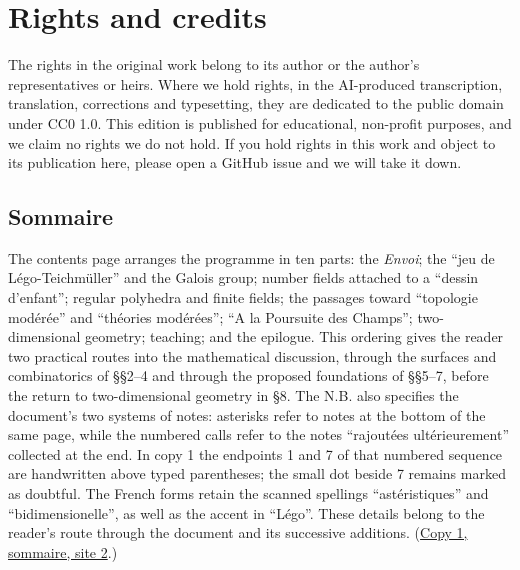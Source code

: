 \documentclass[11pt,a4paper]{article}
\begin{document}
\section*{Rights and credits}
The rights in the original work belong to its author or the author's representatives or heirs. Where we hold rights, in the AI-produced transcription, translation, corrections and typesetting, they are dedicated to the public domain under CC0 1.0. This edition is published for educational, non-profit purposes, and we claim no rights we do not hold. If you hold rights in this work and object to its publication here, please open a GitHub issue and we will take it down.

\clearpage


\subsection*{Sommaire}
The contents page arranges the programme in ten parts: the \emph{Envoi}; the
``jeu de Légo-Teichmüller'' and the Galois group; number fields attached to a
``dessin d'enfant''; regular polyhedra and finite fields; the passages toward
``topologie modérée'' and ``théories modérées''; ``A la Poursuite des Champs'';
two-dimensional geometry; teaching; and the epilogue. This ordering gives the
reader two practical routes into the mathematical discussion, through the
surfaces and combinatorics of \S\S2--4 and through the proposed foundations of
\S\S5--7, before the return to two-dimensional geometry in \S8. The N.B.
also specifies the document's two systems of notes: asterisks refer to notes
at the bottom of the same page, while the numbered calls refer to the notes
``rajoutées ultérieurement'' collected at the end. In copy 1 the endpoints
1 and 7 of that numbered sequence are handwritten above typed parentheses;
the small dot beside 7 remains marked as doubtful. The French forms retain
the scanned spellings ``astéristiques'' and ``bidimensionelle'', as well as
the accent in ``Légo''. These details belong to the reader's route through
the document and its successive additions.
(\href{https://grothendieck.umontpellier.fr/web/viewer.html?file=../119.pdf\#page=3}{Copy 1, sommaire, site 2}.)
\end{document}
